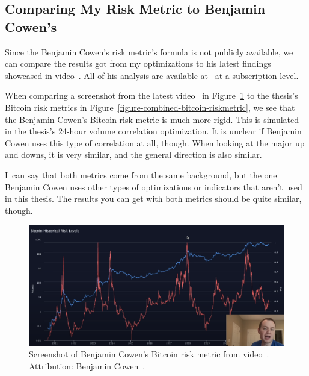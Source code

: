 \subsection*{Comparing My Risk Metric to Benjamin Cowen's}
Since the Benjamin Cowen's risk metric's formula is not publicly available, we can compare the results got from my optimizations to his latest findings showcased in video~\cite{youtube:bitcoin-risk-metric-latest}. All of his analysis are available at~\cite{intothecryptoverse} at a subscription level.

When comparing a screenshot from the latest video~\cite{youtube:bitcoin-risk-metric-latest} in Figure~\ref{figure-cowen-screenshot} to the thesis's Bitcoin risk metrics in Figure~\ref{figure-combined-bitcoin-riskmetric}, we see that the Benjamin Cowen's Bitcoin risk metric is much more rigid. This is simulated in the thesis's 24-hour volume correlation optimization. It is unclear if Benjamin Cowen uses this type of correlation at all, though. When looking at the major up and downs, it is very similar, and the general direction is also similar.

I~can say that both metrics come from the same background, but the one Benjamin Cowen uses other types of optimizations or indicators that aren't used in this thesis. The results you can get with both metrics should be quite similar, though.

\begin{figure}[!t]
    \centering
    \includegraphics[width=\columnwidth]{figures/cowen-riskmetric-screenshot.png}
    \caption{Screenshot of Benjamin Cowen's Bitcoin risk metric from video~\cite{youtube:bitcoin-risk-metric-latest}. Attribution: Benjamin Cowen~\cite{youtube:cowen-yt-channel}.}
    \label{figure-cowen-screenshot}
\end{figure}

